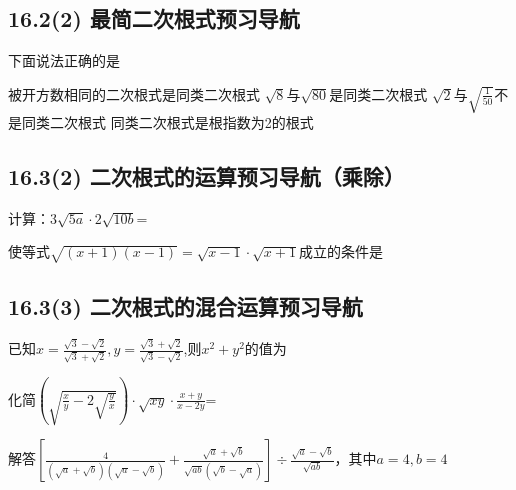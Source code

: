 \documentclass[answers]{exam} %
\begin{document}
\subsection{16.2(2) 最简二次根式预习导航}

\begin{questions}

\question 下面说法正确的是
  \begin{choices}
  \choice 被开方数相同的二次根式是同类二次根式
  \choice $\sqrt{8}$与$\sqrt{80}$是同类二次根式
  \choice $\sqrt{2}$与$\sqrt{\frac{1}{50}}$不是同类二次根式
  \choice 同类二次根式是根指数为2的根式
  \end{choices}

\end{questions}

\subsection{16.3(2) 二次根式的运算预习导航（乘除）}

\begin{questions}
\question
计算：$3 \sqrt{5a} \cdot 2 \sqrt{10b}$=\fillin

\question
使等式$\sqrt{(x+1)(x-1)}=\sqrt{x-1} \cdot \sqrt{x+1}$成立的条件是\fillin

\end{questions}

\subsection{16.3(3) 二次根式的混合运算预习导航}

\begin{questions}

\question
已知$x=\frac{\sqrt{3}-\sqrt{2}}{\sqrt{3}+\sqrt{2}},y=\frac{\sqrt{3}+\sqrt{2}}{\sqrt{3}-\sqrt{2}}$,则$x^2+y^2$的值为\underline{\quad\quad}

\question
化简$(\sqrt{\frac{x}{y}-2\sqrt{\frac{y}{x}}}) \cdot \sqrt{xy} \cdot \frac{x+y}{x-2y}$=\underline{\quad\quad\quad\quad}

\question
解答$[\frac{4}{(\sqrt{a}+\sqrt{b})(\sqrt{a}-\sqrt{b})} + \frac{\sqrt{a}+\sqrt{b}}{\sqrt{ab}(\sqrt{b}-\sqrt{a})}] \div \frac{\sqrt{a}-\sqrt{b}}{\sqrt{ab}}$，其中$a=4,b=4$
  ~\\
  ~\\
  ~\\

\end{questions}   
\end{document}
